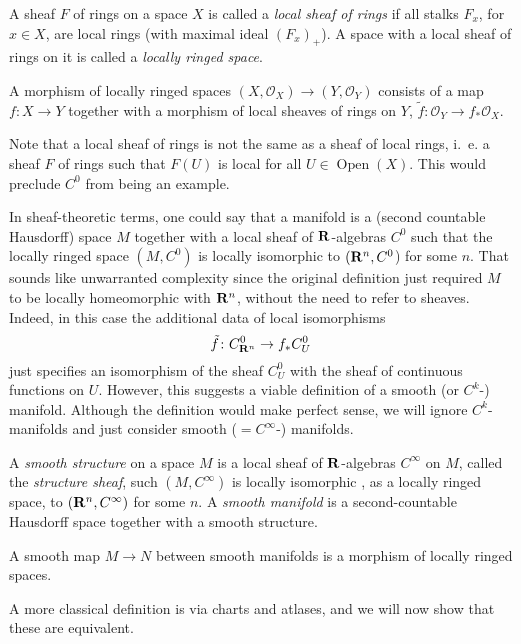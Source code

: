 \documentclass[a4paper,openany]{scrbook}
\DeclareMathOperator{\Open}{Open}
\begin{document}
\begin{defn}
A sheaf $F$ of rings on a space $X$ is called a \emph{local sheaf of rings} if all stalks $F_x$, for $x\in X$, are local rings (with maximal ideal $(F_x)_+$). A space with a local sheaf of rings on it is called a \emph{locally ringed space}.

A morphism of locally ringed spaces $(X,\mathcal O_X) \to (Y,\mathcal O_Y)$ consists of a map $f\colon X \to Y$ together with a morphism of local sheaves of rings on $Y$, $\tilde f\colon \mathcal O_Y \to f_*\mathcal O_X$. 
\end{defn}

Note that a local sheaf of rings is not the same as a sheaf of local rings, i.~e. a sheaf $F$ of rings such that $F(U)$ is local for all $U \in \Open(X)$. This would preclude $C^0$ from being an example.

In sheaf-theoretic terms, one could say that a manifold is a (second countable Hausdorff) space $M$ together with a local sheaf of $\mathbf R$-algebras $C^0$ such that the locally ringed space $(M,C^0)$ is locally isomorphic to $(\mathbf R^n,C^0$) for some $n$. That sounds like unwarranted complexity since the original definition just required $M$ to be locally homeomorphic with $\mathbf R^n$, without the need to refer to sheaves. Indeed, in this case the additional data of local isomorphisms
\[
\tilde f\colon C^0_{\mathbf R^n} \to f_*C^0_{U}
\]
just specifies an isomorphism of the sheaf $C^0_U$ with the sheaf of continuous functions on $U$. 
However, this suggests a viable definition of a smooth (or $C^k$-) manifold. Although the definition would make perfect sense, we will ignore $C^k$-manifolds and just consider smooth ($=C^\infty$-) manifolds. 

\begin{defn}
A \emph{smooth structure} on a space $M$ is a local sheaf of $\mathbf R$-algebras $C^\infty$ on $M$, called the \emph{structure sheaf}, such $(M,C^\infty)$ is locally isomorphic , as a locally ringed space, to $(\mathbf R^n,C^\infty)$ for some $n$. A \emph{smooth manifold} is a second-countable Hausdorff space together with a smooth structure.

A smooth map $M \to N$ between smooth manifolds is a morphism of locally ringed spaces.
\end{defn}

A more classical definition is via charts and atlases, and we will now show that these are equivalent.
\end{document}
